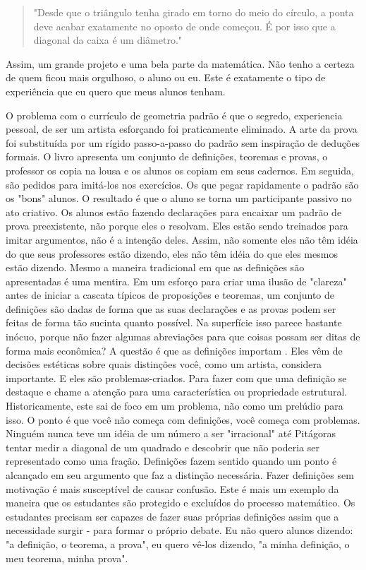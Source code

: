 \documentclass[a4paper,oneside,12pt,notitlepage]{article}
\begin{document}
\begin{quote}
"Desde que o triângulo tenha girado em torno do meio do círculo, a ponta deve acabar exatamente no oposto de onde começou. É por isso que a diagonal da caixa é um diâmetro."
\end{quote}

Assim, um grande projeto e uma bela parte da matemática. Não tenho a certeza de quem ficou mais orgulhoso, o aluno ou eu. Este é exatamente o tipo de experiência que eu quero que meus alunos tenham.

\vspace{1em}

O problema com o currículo de geometria padrão é que o segredo, experiencia pessoal, de ser um artista esforçando foi praticamente eliminado. A arte da prova foi substituída por um rígido passo-a-passo do padrão sem inspiração de deduções formais. O livro apresenta um conjunto de definições, teoremas e provas, o professor os copia na lousa e os alunos os copiam em seus cadernos. Em seguida, são pedidos para imitá-los nos exercícios. Os que pegar rapidamente o padrão são os "bons" alunos.
O resultado é que o aluno se torna um participante passivo no ato criativo. Os alunos estão
fazendo declarações para encaixar um padrão de prova preexistente, não porque eles o resolvam. Eles estão
sendo treinados para imitar argumentos, não é a intenção deles. Assim, não somente eles não têm idéia do que seus
professores estão dizendo, eles não têm idéia do que eles mesmos estão dizendo.
Mesmo a maneira tradicional em que as definições são apresentadas é uma mentira. Em um esforço para criar uma
ilusão de "clareza" antes de iniciar a cascata típicos de proposições e teoremas, um conjunto
de definições são dadas de forma que as suas declarações e as provas podem ser feitas de forma tão sucinta quanto
possível. Na superfície isso parece bastante inócuo, porque não fazer algumas abreviações para que
coisas possam ser ditas de forma mais econômica? A questão é que as definições importam . Eles vêm de decisões estéticas sobre quais distinções você, como um artista, considera importante. E eles são problemas-criados. Para fazer com que uma definição se destaque e chame a atenção para uma característica ou propriedade estrutural. Historicamente, este sai de foco em um problema, não como um prelúdio para isso. O ponto é que você não começa com definições, você começa com problemas. Ninguém nunca teve um idéia de um número a ser "irracional" até Pitágoras tentar medir a diagonal de um quadrado e descobrir que não poderia ser representado como uma fração. Definições fazem sentido quando um ponto é alcançado em seu argumento que faz a distinção necessária. Fazer definições sem motivação é mais susceptível de causar confusão.
Este é mais um exemplo da maneira que os estudantes são protegido e excluídos do processo matemático. Os estudantes precisam ser capazes de fazer suas próprias definições assim que a necessidade surgir - para formar o próprio debate. Eu não quero alunos dizendo: "a definição, o
teorema, a prova", eu quero vê-los dizendo, "a minha definição, o meu teorema, minha prova". 
\end{document}
